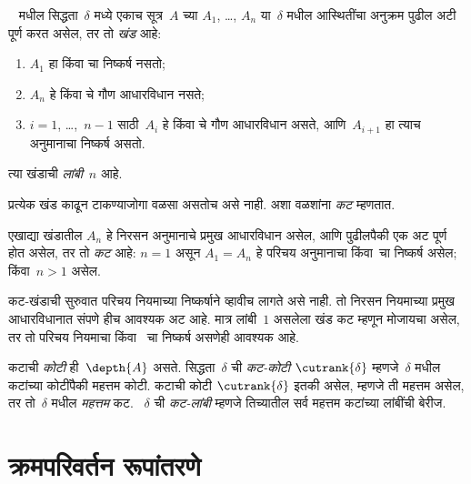 \begin{defn}
~ मधील
सिद्धता~$\delta$
मध्ये एकाच सूत्र~$A$
च्या $A_1$, \dots,
$A_n$ या~$\delta$
मधील आस्थितींचा
अनुक्रम पुढील अटी
पूर्ण करत असेल,
तर तो \emph{खंड} आहे:
\begin{enumerate}
  \item $A_1$ हा
  \Elim{\lor} किंवा
  \Elim{\lexists}
  चा निष्कर्ष नसतो;
  \item $A_n$ हे
  \Elim{\lor} किंवा
  \Elim{\lexists}
  चे गौण आधारविधान नसते;
  \item $i = 1$, \dots,~$n-1$
  साठी~$A_i$ हे
  \Elim{\lor} किंवा
  \Elim{\lexists}
  चे गौण आधारविधान
  असते, आणि~$A_{i+1}$
  हा त्याच अनुमानाचा
  निष्कर्ष असतो.
\end{enumerate}
त्या खंडाची
\emph{लांबी}~$n$ आहे.
\end{defn}

प्रत्येक खंड काढून
टाकण्याजोगा वळसा
असतोच असे नाही.
अशा वळशांना
\emph{कट} म्हणतात.

\begin{defn}
एखाद्या खंडातील
$A_n$ हे
निरसन अनुमानाचे
प्रमुख आधारविधान असेल,
आणि पुढीलपैकी एक
अट पूर्ण होत असेल,
तर तो \emph{कट} आहे:
$n=1$ असून
$A_1 = A_n$ हे
परिचय अनुमानाचा
किंवा~\FalseInt चा
निष्कर्ष असेल;
किंवा~$n>1$ असेल.
\end{defn}

कट-खंडाची सुरुवात
परिचय नियमाच्या
निष्कर्षाने व्हावीच
लागते असे नाही.
तो निरसन
नियमाच्या प्रमुख
आधारविधानात संपणे
हीच आवश्यक अट आहे.
मात्र लांबी~$1$
असलेला खंड कट
म्हणून मोजायचा असेल,
तर तो परिचय
नियमाचा किंवा~\FalseInt
चा निष्कर्ष असणेही
आवश्यक आहे.

\begin{defn}
कटाची \emph{कोटी}
ही~$\depth{A}$
असते. सिद्धता~$\delta$
ची \emph{कट-कोटी}
$\cutrank{\delta}$
म्हणजे~$\delta$
मधील कटांच्या
कोटींपैकी महत्तम कोटी.
कटाची कोटी
$\cutrank{\delta}$
इतकी असेल, म्हणजे
ती महत्तम असेल,
तर तो~$\delta$
मधील \emph{महत्तम} कट.
~$\delta$ ची
\emph{कट-लांबी}
म्हणजे तिच्यातील
सर्व महत्तम कटांच्या
लांबींची बेरीज.
\end{defn}













\section{क्रमपरिवर्तन रूपांतरणे}\label{pt:nor:per:sec}


